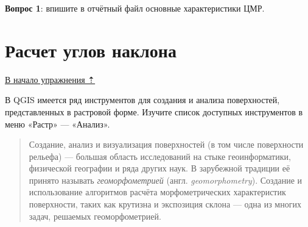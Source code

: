 \documentclass[
  12pt,
]{book}
\begin{document}
\textbf{Вопрос 1}: впишите в отчётный файл основные характеристики ЦМР.

\hypertarget{weighted-overlay-slopes}{%
\section{Расчет углов наклона}\label{weighted-overlay-slopes}}

\protect\hyperlink{weighted-overlay}{В начало упражнения ⇡}

В QGIS имеется ряд инструментов для создания и анализа поверхностей, представленных в растровой форме. Изучите список доступных инструментов в меню «Растр» --- «Анализ».

\begin{quote}
Создание, анализ и визуализация поверхностей (в том числе поверхности рельефа) --- большая область исследований на стыке геоинформатики, физической географии и ряда других наук. В зарубежной традиции её принято называть \emph{геоморфометрией} (англ. \emph{geomorphometry}). Создание и использование алгоритмов расчёта морфометрических характеристик поверхности, таких как крутизна и экспозиция склона --- одна из многих задач, решаемых геоморфометрией.
\end{quote}
\end{document}
